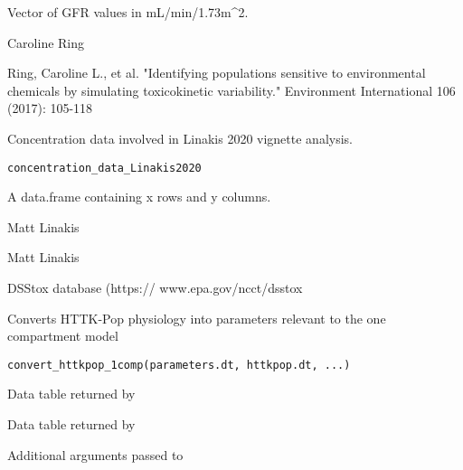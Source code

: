 \documentclass[a4paper]{book}
\begin{document}
%
\begin{Value}
Vector of GFR values in mL/min/1.73m\textasciicircum{}2.
\end{Value}
%
\begin{Author}\relax
Caroline Ring
\end{Author}
%
\begin{References}\relax
Ring, Caroline L., et al. "Identifying populations sensitive to 
environmental chemicals by simulating toxicokinetic variability." Environment 
International 106 (2017): 105-118
\end{References}
%
\begin{Description}\relax
Concentration data involved in Linakis 2020 vignette analysis.
\end{Description}
%
\begin{Usage}
\begin{verbatim}
concentration_data_Linakis2020
\end{verbatim}
\end{Usage}
%
\begin{Format}
A data.frame containing x rows and y columns.
\end{Format}
%
\begin{Author}\relax
Matt Linakis
\end{Author}
%
\begin{Source}\relax
Matt Linakis
\end{Source}
%
\begin{References}\relax
DSStox database (https:// www.epa.gov/ncct/dsstox
\end{References}
%
\begin{Description}\relax
Converts HTTK-Pop physiology into parameters relevant to the one
compartment model
\end{Description}
%
\begin{Usage}
\begin{verbatim}
convert_httkpop_1comp(parameters.dt, httkpop.dt, ...)
\end{verbatim}
\end{Usage}
%
\begin{Arguments}
\begin{ldescription}
\item[\code{parameters.dt}] Data table returned by 

\item[\code{httkpop.dt}] Data table returned by 

\item[\code{...}] Additional arguments passed to 
\end{ldescription}
\end{Arguments}
\end{document}
